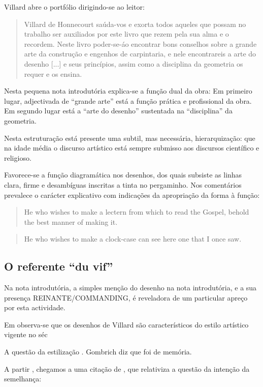 \documentclass{article}
\begin{document}
Villard abre o portfólio dirigindo-se ao leitor:

\begin{quote} Villard de Honnecourt saúda-vos e exorta todos aqueles
que possam no trabalho ser auxiliados por este livro que rezem pela
sua alma e o recordem. Neste livro poder-se-áo encontrar bons
conselhos sobre a grande arte da construção e engenhos de carpintaria,
e nele encontrareis a arte do desenho [...] e seus princípios, assim
como a disciplina da geometria os requer e os ensina.
\end{quote}

Nesta pequena nota introdutória explica-se a função dual da obra: Em
primeiro lugar, adjectivada de ``grande arte'' está a função prática e
profissional da obra. Em segundo lugar está a ``arte do desenho''
sustentada na ``disciplina'' da geometria.

Nesta estruturação está presente uma subtil, mas necessária,
hierarquização: que na idade média o discurso artístico está sempre
submisso aos discursos científico e religioso.

Favorece-se a função diagramática nos desenhos, dos quais subsiste as
linhas clara, firme e desambíguas inscritas a tinta no pergaminho. Nos
comentários prevalece o carácter explicativo com indicações da
apropriação da forma à função:

\begin{quote}
He who wishes to make a lectern from which to read the
Gospel, behold the best manner of making it.
\end{quote}

\begin{quote}
He who wishes to make a clock-case can see here one that I once saw.
\end{quote}

\subsection{O referente ``du vif''}

Na nota introdutória, a simples menção do desenho na nota
introdutória, e a sua presença REINANTE/COMMANDING, é reveladora de um
particular apreço por esta actividade.

Em \cite{teresa} observa-se que os desenhos de Villard são
característicos do estilo artístico vigente no séc

A questão da estilização \cite{gombrich}. Gombrich diz que foi de
memória.

A partir \cite{teresa}, chegamos a uma citação de \cite{schlosser},
que relativiza a questão da intenção da semelhança:
\end{document}
